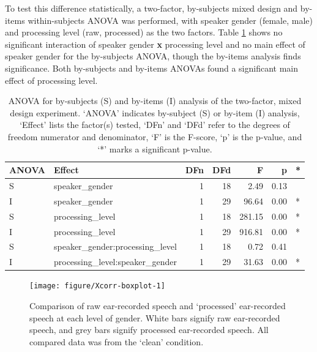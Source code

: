 To test this difference statistically, a two-factor, by-subjects mixed design and by-items within-subjects ANOVA was performed, with speaker gender (female, male) and processing level (raw, processed) as the two factors.  Table \ref{tab:anova_data-collection} shows no significant interaction of speaker gender \textbf{x} processing level and no main effect of speaker gender for the by-subjects ANOVA, though the by-items analysis finds significance.  Both by-subjects and by-items ANOVAs found a significant main effect of processing level.




\begin{table}[ht]
\centering
\begin{tabular}{llrrrrl}
  \hline
ANOVA & Effect & DFn & DFd & F & p & * \\ 
  \hline
S & speaker\_gender & 1 & 18 & 2.49 & 0.13 &  \\ 
  I & speaker\_gender & 1 & 29 & 96.64 & 0.00 & * \\ 
  S & processing\_level & 1 & 18 & 281.15 & 0.00 & * \\ 
  I & processing\_level & 1 & 29 & 916.81 & 0.00 & * \\ 
  S & speaker\_gender:processing\_level & 1 & 18 & 0.72 & 0.41 &  \\ 
  I & processing\_level:speaker\_gender & 1 & 29 & 31.63 & 0.00 & * \\ 
   \hline
\end{tabular}
\caption{ANOVA for by-subjects (S) and by-items (I) analysis of the two-factor, mixed design experiment. \DIFaddbeginFL {}\DIFaddendFL `ANOVA' indicates by-subject (S) or by-item (I) analysis, `Effect' lists the factor(s) tested, `DFn' and `DFd' refer to the degrees of freedom numerator and denominator, `F' is the F-score, `p' is the p-value, and `*' marks a significant p-value.} 
\label{tab:anova_data-collection}
\end{table}



\begin{figure}[h!]
\DIFaddbeginFL \centering
\textbf{}
\DIFaddendFL 

\texttt{[image: figure/Xcorr-boxplot-1]} 

\caption{Comparison of raw ear-recorded speech and `processed' ear-recorded speech at each level of gender.  White bars signify raw ear-recorded speech, and grey bars signify processed ear-recorded speech. All compared data was from the `clean' condition.}\label{fig:data-collection-viz}
\end{figure}


